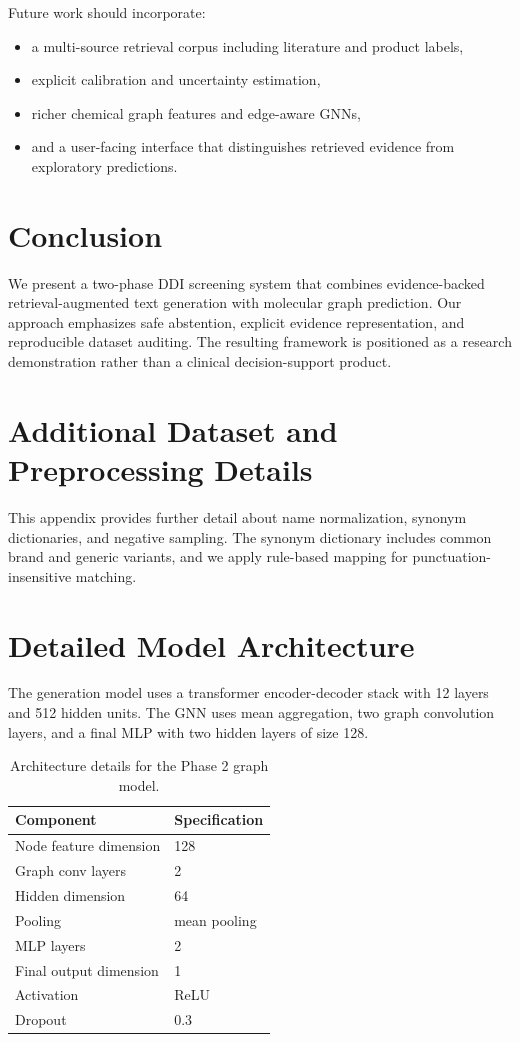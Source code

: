\documentclass[conference]{IEEEtran}
\begin{document}
Future work should incorporate:
\begin{itemize}
    \item a multi-source retrieval corpus including literature and product labels,
    \item explicit calibration and uncertainty estimation,
    \item richer chemical graph features and edge-aware GNNs,
    \item and a user-facing interface that distinguishes retrieved evidence from exploratory predictions.
\end{itemize}

\section{Conclusion}
We present a two-phase DDI screening system that combines evidence-backed retrieval-augmented text generation with molecular graph prediction. Our approach emphasizes safe abstention, explicit evidence representation, and reproducible dataset auditing. The resulting framework is positioned as a research demonstration rather than a clinical decision-support product.

\appendices
\section{Additional Dataset and Preprocessing Details}
This appendix provides further detail about name normalization, synonym dictionaries, and negative sampling. The synonym dictionary includes common brand and generic variants, and we apply rule-based mapping for punctuation-insensitive matching.

\section{Detailed Model Architecture}
The generation model uses a transformer encoder-decoder stack with 12 layers and 512 hidden units. The GNN uses mean aggregation, two graph convolution layers, and a final MLP with two hidden layers of size 128.

\begin{table}[t]
    \centering
    \caption{Architecture details for the Phase 2 graph model.}
    \label{tab:appendix_arch}
    \begin{tabular}{@{}ll@{}}
    \toprule
    Component & Specification \\
    \midrule
    Node feature dimension & 128 \\
    Graph conv layers & 2 \\
    Hidden dimension & 64 \\
    Pooling & mean pooling \\
    MLP layers & 2 \\
    Final output dimension & 1 \\
    Activation & ReLU \\
    Dropout & 0.3 \\
    \bottomrule
    \end{tabular}
\end{table}
\end{document}

